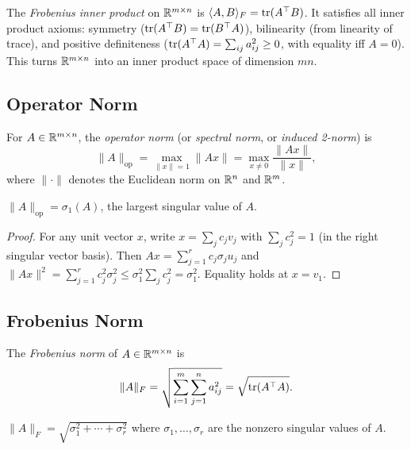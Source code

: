 \documentclass[11pt,a4paper]{article}
\begin{document}
\begin{example}
\label{ex:trace_inner_product}
The \emph{Frobenius inner product} on $\mathbb{R}^{m \times n}$ is
$\langle A, B \rangle_F = \operatorname{tr}(A^\top B)$.  It satisfies all inner
product axioms: symmetry ($\operatorname{tr}(A^\top B) = \operatorname{tr}(B^\top A)$),
bilinearity (from linearity of trace), and positive definiteness
($\operatorname{tr}(A^\top A) = \sum_{ij} a_{ij}^2 \geq 0$, with equality iff
$A = 0$).  This turns $\mathbb{R}^{m \times n}$ into an inner product space
of dimension $mn$.
\end{example}

\subsection{Operator Norm}

\begin{definition}
\label{def:op_norm}
For $A \in \mathbb{R}^{m \times n}$, the \emph{operator norm} (or
\emph{spectral norm}, or \emph{induced 2-norm}) is
\[
  \|A\|_{\mathrm{op}} = \max_{\|x\| = 1} \|Ax\|
  = \max_{x \neq 0} \frac{\|Ax\|}{\|x\|},
\]
where $\|\cdot\|$ denotes the Euclidean norm on $\mathbb{R}^n$ and $\mathbb{R}^m$.
\end{definition}

\begin{proposition}
\label{prop:op_norm_sigma}
$\|A\|_{\mathrm{op}} = \sigma_1(A)$, the largest singular value of $A$.
\end{proposition}

\begin{proof}
For any unit vector $x$, write $x = \sum_j c_j v_j$ with
$\sum_j c_j^2 = 1$ (in the right singular vector basis).  Then
$Ax = \sum_{j=1}^r c_j \sigma_j u_j$ and
$\|Ax\|^2 = \sum_{j=1}^r c_j^2 \sigma_j^2 \leq \sigma_1^2 \sum_j c_j^2
= \sigma_1^2$.
Equality holds at $x = v_1$.
\end{proof}

\subsection{Frobenius Norm}

\begin{definition}
\label{def:frobenius_norm}
The \emph{Frobenius norm} of $A \in \mathbb{R}^{m \times n}$ is
\[
  \|A\|_F = \sqrt{\sum_{i=1}^m \sum_{j=1}^n a_{ij}^2}
  = \sqrt{\operatorname{tr}(A^\top A)}.
\]
\end{definition}

\begin{proposition}
\label{prop:frob_singular}
$\|A\|_F = \sqrt{\sigma_1^2 + \cdots + \sigma_r^2}$ where
$\sigma_1, \ldots, \sigma_r$ are the nonzero singular values of $A$.
\end{proposition}
\end{document}
